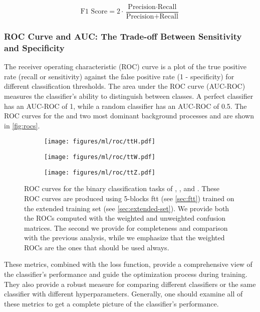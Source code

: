 \begin{equation}
    \text{F1 Score} = 2 \cdot \frac{\text{Precision} \cdot \text{Recall}}{\text{Precision} + \text{Recall}}
\end{equation}

\subsubsection{ROC Curve and AUC: The Trade-off Between Sensitivity and Specificity}

The receiver operating characteristic (ROC) curve is a plot of the true positive rate (recall or sensitivity) against
the false positive rate (1 - specificity) for different classification thresholds. The area under the ROC curve
(AUC-ROC) measures the classifier's ability to distinguish between classes. A perfect classifier has an AUC-ROC of 1,
while a random classifier has an AUC-ROC of 0.5. The ROC curves for the \tth and two most dominant background processes
\ttw and \ttz are shown in \autoref{fig:rocs}.

\begin{figure}[htb]
    \centering
    \begin{subfigure}{0.32\textwidth}
        \texttt{[image: figures/ml/roc/ttH.pdf]}
        \caption{\tth}
        \label{fig:roc-tth}
    \end{subfigure}
    \begin{subfigure}{0.32\textwidth}
        \texttt{[image: figures/ml/roc/ttW.pdf]}
        \caption{\ttw}
        \label{fig:roc-ttw}
    \end{subfigure}
    \begin{subfigure}{0.32\textwidth}
        \texttt{[image: figures/ml/roc/ttZ.pdf]}
        \caption{\ttz}
        \label{fig:roc-ttz}
    \end{subfigure}
    \caption{ROC curves for the binary classification tasks of \tth, \ttw, and \ttz. These ROC curves are
        produced using 5-blocks \gls{ftt} (see \autoref{sec:ftt}) trained on the extended training set (see
        \autoref{sec:extended-set}). We provide both the ROCs computed with the weighted and unweighted confusion
        matrices. The second we provide for completeness and comparison with the previous analysis, while we emphasize
        that the weighted ROCs are the ones that should be used always.} \label{fig:rocs}
\end{figure}


These metrics, combined with the loss function, provide a comprehensive view of the classifier's performance and guide
the optimization process during training. They also provide a robust measure for comparing different classifiers or the
same classifier with different hyperparameters. Generally, one should examine all of these metrics to get a complete
picture of the classifier's performance.